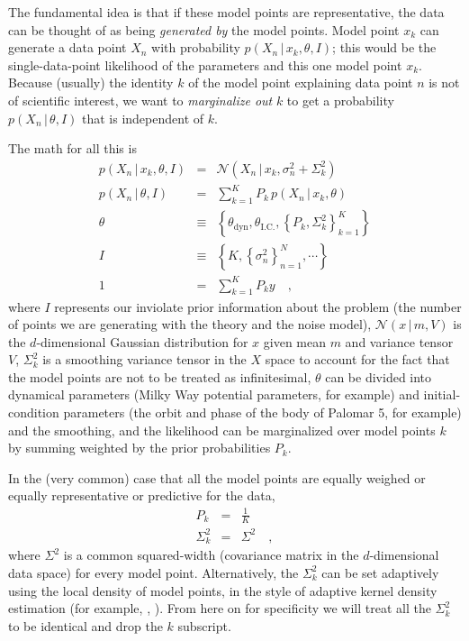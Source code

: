\documentclass[12pt,pdftex,preprint]{aastex}
\newcommand{\setof}[1]{\left\{{#1}\right\}}
\newcommand{\given}{\,|\,}
\newcommand{\dyn}{\mathrm{dyn}}
\newcommand{\ic}{\mathrm{I.C.}}
\newcommand{\normal}{\mathscr{N}}
\begin{document}
The fundamental idea is that if these model points are representative,
the data can be thought of as being \emph{generated by} the model
points.  Model point $x_k$ can generate a data point $X_n$ with
probability $p(X_n\given x_k,\theta,I)$; this would be the
single-data-point likelihood of the parameters and this one model
point $x_k$.  Because (usually) the identity $k$ of the model point
explaining data point $n$ is not of scientific interest, we want to
\emph{marginalize out} $k$ to get a probability $p(X_n\given\theta,I)$
that is independent of $k$.

The math for all this is
\begin{eqnarray}
p(X_n\given x_k,\theta,I) &=& \normal(X_n\given x_k,\sigma^2_n+\Sigma_k^2)
\\
p(X_n\given\theta,I) &=& \sum_{k=1}^K P_k\,p(X_n\given x_k,\theta)
\\
\theta &\equiv& \setof{\theta_\dyn, \theta_\ic, \setof{P_k, \Sigma_k^2}_{k=1}^K }
\\
I &\equiv& \setof{K, \setof{\sigma^2_n}_{n=1}^N, \cdots}
\\
1 &=& \sum_{k=1}^K P_ky
\quad ,
\end{eqnarray}
where $I$ represents our inviolate prior information about the problem
(the number of points we are generating with the theory and the noise
model), $\normal(x\given m, V)$ is the $d$-dimensional Gaussian
distribution for $x$ given mean $m$ and variance tensor $V$,
$\Sigma^2_k$ is a smoothing variance tensor in the $X$ space to
account for the fact that the model points are not to be treated as
infinitesimal, $\theta$ can be divided into dynamical parameters
(Milky Way potential parameters, for example) and initial-condition
parameters (the orbit and phase of the body of Palomar 5, for example)
and the smoothing, and the likelihood can be marginalized over model
points $k$ by summing weighted by the prior probabilities $P_k$.

In the (very common) case that all the model points are
equally weighed or equally representative or predictive for the data,
\begin{eqnarray}
P_k &=& \frac{1}{K}
\\
\Sigma^2_k &=& \Sigma^2
\quad ,
\end{eqnarray}
where $\Sigma^2$ is a common squared-width (covariance matrix in the
$d$-dimensional data space) for every model point.  Alternatively, the
$\Sigma^2_k$ can be set adaptively using the local density of model
points, in the style of adaptive kernel density estimation (for
example, \citealt{adaptiveKDE1}, \citealt{adaptiveKDE2}).  From here
on for specificity we will treat all the $\Sigma^2_k$ to be identical
and drop the $k$ subscript.
\end{document}
